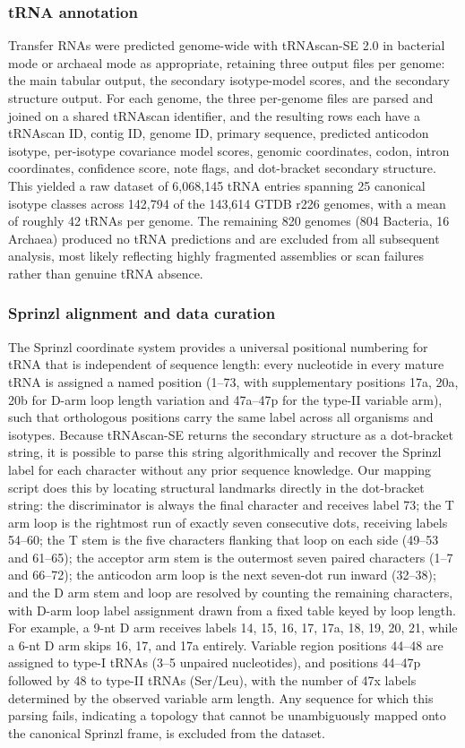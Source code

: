 \documentclass{article}
\begin{document}
\subsubsection{tRNA annotation}
Transfer RNAs were predicted genome-wide with tRNAscan-SE 2.0 in bacterial mode or archaeal mode as appropriate, retaining three output files per genome: the main tabular output, the secondary isotype-model scores, and the secondary structure output. For each genome, the three per-genome files are parsed and joined on a shared tRNAscan identifier, and the resulting rows each have a tRNAscan ID, contig ID, genome ID, primary sequence, predicted anticodon isotype, per-isotype covariance model scores, genomic coordinates, codon, intron coordinates, confidence score, note flags, and dot-bracket secondary structure. This yielded a raw dataset of 6,068,145 tRNA entries spanning 25 canonical isotype classes across 142,794 of the 143,614 GTDB r226 genomes, with a mean of roughly 42 tRNAs per genome. The remaining 820 genomes (804 Bacteria, 16 Archaea) produced no tRNA predictions and are excluded from all subsequent analysis, most likely reflecting highly fragmented assemblies or scan failures rather than genuine tRNA absence.

\subsubsection{ Sprinzl alignment and data curation}

The Sprinzl coordinate system provides a universal positional numbering for tRNA that is independent of sequence length: every nucleotide in every mature tRNA is assigned a named position (1–73, with supplementary positions 17a, 20a, 20b for D-arm loop length variation and 47a–47p for the type-II variable arm), such that orthologous positions carry the same label across all organisms and isotypes. Because tRNAscan-SE returns the secondary structure as a dot-bracket string, it is possible to parse this string algorithmically and recover the Sprinzl label for each character without any prior sequence knowledge. Our mapping script does this by locating structural landmarks directly in the dot-bracket string: the discriminator is always the final character and receives label 73; the T arm loop is the rightmost run of exactly seven consecutive dots, receiving labels 54–60; the T stem is the five characters flanking that loop on each side (49–53 and 61–65); the acceptor arm stem is the outermost seven paired characters (1–7 and 66–72); the anticodon arm loop is the next seven-dot run inward (32–38); and the D arm stem and loop are resolved by counting the remaining characters, with D-arm loop label assignment drawn from a fixed table keyed by loop length. For example, a 9-nt D arm receives labels 14, 15, 16, 17, 17a, 18, 19, 20, 21, while a 6-nt D arm skips 16, 17, and 17a entirely. Variable region positions 44–48 are assigned to type-I tRNAs (3–5 unpaired nucleotides), and positions 44–47p followed by 48 to type-II tRNAs (Ser/Leu), with the number of 47x labels determined by the observed variable arm length. Any sequence for which this parsing fails, indicating a topology that cannot be unambiguously mapped onto the canonical Sprinzl frame, is excluded from the dataset. 
\end{document}
